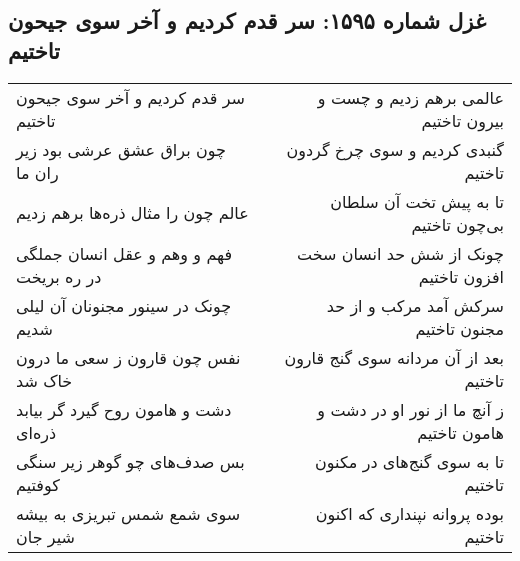 \begin{center}
\section*{غزل شماره ۱۵۹۵: سر قدم کردیم و آخر سوی جیحون تاختیم}
\label{sec:1595}
\begin{longtable}{l p{0.5cm} r}
سر قدم کردیم و آخر سوی جیحون تاختیم
&&
عالمی برهم زدیم و چست و بیرون تاختیم
\\
چون براق عشق عرشی بود زیر ران ما
&&
گنبدی کردیم و سوی چرخ گردون تاختیم
\\
عالم چون را مثال ذره‌ها برهم زدیم
&&
تا به پیش تخت آن سلطان بی‌چون تاختیم
\\
فهم و وهم و عقل انسان جملگی در ره بریخت
&&
چونک از شش حد انسان سخت افزون تاختیم
\\
چونک در سینور مجنونان آن لیلی شدیم
&&
سرکش آمد مرکب و از حد مجنون تاختیم
\\
نفس چون قارون ز سعی ما درون خاک شد
&&
بعد از آن مردانه سوی گنج قارون تاختیم
\\
دشت و هامون روح گیرد گر بیابد ذره‌ای
&&
ز آنچ ما از نور او در دشت و هامون تاختیم
\\
بس صدف‌های چو گوهر زیر سنگی کوفتیم
&&
تا به سوی گنج‌های در مکنون تاختیم
\\
سوی شمع شمس تبریزی به بیشه شیر جان
&&
بوده پروانه نپنداری که اکنون تاختیم
\\
\end{longtable}
\end{center}
